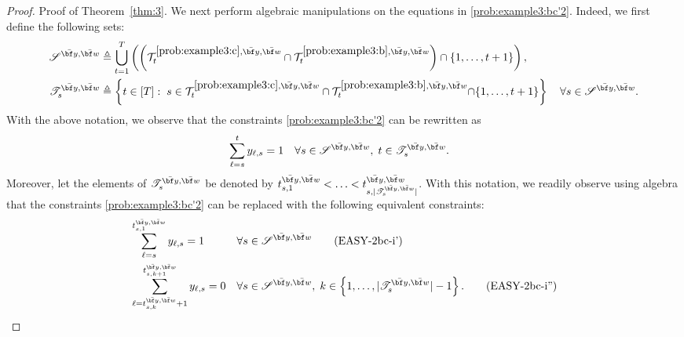 \documentclass[nonblindrev,mnsc]{informs3} %
\newcommand{\bw}{{\bf w}}
\newcommand{\by}{{\bf y}}
\begin{document}
\begin{APPENDICES}
\begin{proof}{Proof of Theorem~\ref{thm:3}.}
We next perform algebraic manipulations on the equations in \eqref{prob:example3:bc'2}. 
Indeed, we first define the following sets:
 \begin{align*}
 \mathscr{S}^{\bar{\by},\bar{\bw}} &\triangleq \bigcup_{t =1}^T  \left( \left( \mathcal{T}^{\ref{prob:example3:c},\bar{\by},\bar{\bw}}_t \cap \mathcal{T}^{\ref{prob:example3:b},\bar{\by},\bar{\bw}}_t\right) \cap \{1,\ldots,t+1\} \right),\\
  \mathscr{T}^{\bar{\by},\bar{\bw}}_s &\triangleq \left \{ t \in [T]:\; s \in \mathcal{T}^{\ref{prob:example3:c},\bar{\by},\bar{\bw}}_t \cap \mathcal{T}^{\ref{prob:example3:b},\bar{\by},\bar{\bw}}_t {\cap \{1,\ldots,t+1\}} \right \} \quad  \forall s \in \mathscr{S}^{\bar{\by},\bar{\bw}}.
 \end{align*} 
 With the above notation, we observe that the constraints \eqref{prob:example3:bc'2} can be rewritten as 
 \begin{align*}
 &\sum_{\ell=s}^t  y_{\ell,s}   = 1 && \forall s \in \mathscr{S}^{\bar{\by},\bar{\bw}}, \; t \in \mathscr{T}^{\bar{\by},\bar{\bw}}_s.%
 \end{align*}
Moreover, let the elements of $\mathscr{T}^{\bar{\by},\bar{\bw}}_s$ be denoted by $t^{\bar{\by},\bar{\bw}}_{s,1} < \ldots < t^{\bar{\by},\bar{\bw}}_{s,| \mathscr{T}^{\bar{\by},\bar{\bw}}_s|}$. 
With this notation, we readily observe using algebra that the constraints \eqref{prob:example3:bc'2} can be replaced with the following equivalent constraints:
 \begin{align}
 &\sum_{\ell=s}^{t_{s,1}^{\bar{\by},\bar{\bw}}}  y_{\ell,s}   = 1 && \forall s \in \mathscr{S}^{\bar{\by},\bar{\bw}}  \tag{EASY-2bc-i'} \label{prob:example3:bc2_prime}\\
  &\sum_{\ell={t^{\bar{\by},\bar{\bw}}_{s,k}}+1}^{t^{\bar{\by},\bar{\bw}}_{s,k+1}}  y_{\ell,s}   = 0 && \forall s \in \mathscr{S}^{\bar{\by},\bar{\bw}}, \; k \in \left\{1,\ldots,|\mathscr{T}^{\bar{\by},\bar{\bw}}_s| - 1 \right \}.  \tag{EASY-2bc-i''} \label{prob:example3:bc2_prime_prime}
 \end{align}



\end{proof}
\end{APPENDICES}
\end{document}
